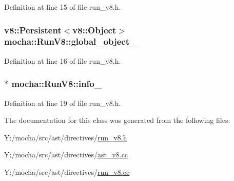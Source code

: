 Definition at line 15 of file run\_\-v8.h.

\hypertarget{classmocha_1_1_run_v8_aa46a56cddee1d07bd60b3c3022f3071a}{
\subsubsection[{global\_\-object\_\-}]{\setlength{\rightskip}{0pt plus 5cm}v8::Persistent$<$v8::Object$>$ {\bf mocha::RunV8::global\_\-object\_\-}}}
\label{classmocha_1_1_run_v8_aa46a56cddee1d07bd60b3c3022f3071a}


Definition at line 16 of file run\_\-v8.h.

\hypertarget{classmocha_1_1_run_v8_a39a819b8eacdb05dc0acd6b3e5f26153}{
\subsubsection[{info\_\-}]{$\ast$ {\bf mocha::RunV8::info\_\-}}}
\label{classmocha_1_1_run_v8_a39a819b8eacdb05dc0acd6b3e5f26153}


Definition at line 19 of file run\_\-v8.h.



The documentation for this class was generated from the following files:\begin{DoxyCompactItemize}
\item 
Y:/mocha/src/ast/directives/\hyperlink{run__v8_8h}{run\_\-v8.h}\item 
Y:/mocha/src/ast/directives/\hyperlink{ast__v8_8cc}{ast\_\-v8.cc}\item 
Y:/mocha/src/ast/directives/\hyperlink{run__v8_8cc}{run\_\-v8.cc}\end{DoxyCompactItemize}
